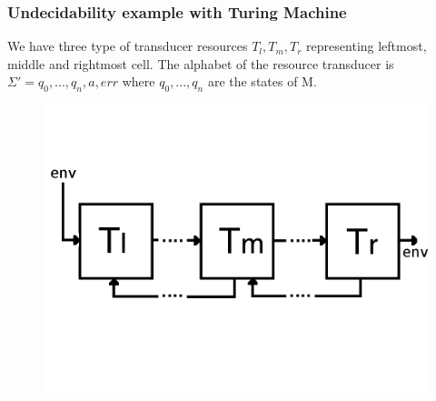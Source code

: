 \documentclass{beamer}
\begin{document}
\begin{frame}[fragile]
\frametitle{Undecidability example with Turing Machine}
We have three type of transducer resources $T_{l},T_{m},T_{r}$ representing leftmost, middle and rightmost cell. The alphabet of the resource transducer is $\Sigma ' = {q_{0},...,q_{n},a,err}$ where $q_{0},...,q_{n}$ are the states of M.
\begin{figure}
\includegraphics[width=0.9\linewidth]{TM}
\end{figure}
\end{frame}
\end{document}
